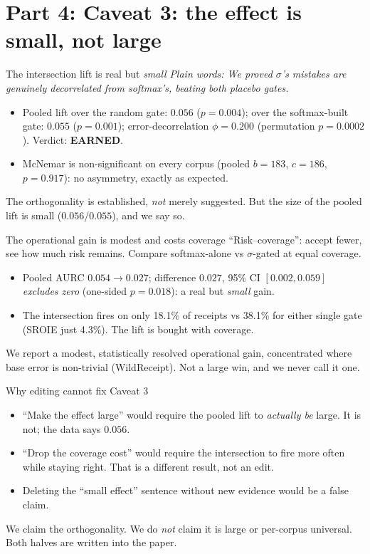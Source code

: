 \documentclass[aspectratio=169]{beamer}
\newcommand{\poolMcB}{183}
\newcommand{\poolMcC}{186}
\newcommand{\poolMcP}{0.917}
\newcommand{\orthEarned}{EARNED}
\newcommand{\orthDrand}{0.056}
\newcommand{\orthDrandP}{0.004}
\newcommand{\orthDcorr}{0.055}
\newcommand{\orthDcorrP}{0.001}
\newcommand{\orthPhi}{0.200}
\newcommand{\orthPhiP}{0.0002}
\newcommand{\rcAURCsoft}{0.054}
\newcommand{\rcAURCsig}{0.027}
\newcommand{\rcAURCd}{0.027}
\newcommand{\rcAURCdLo}{0.002}
\newcommand{\rcAURCdHi}{0.059}
\newcommand{\rcAURCp}{0.018}
\newcommand{\keybox}[1]{\begin{center}\colorbox{grey!15}{\parbox{0.92\linewidth}{\centering #1}}\end{center}}
\newcommand{\plain}[1]{\textit{\textcolor{sig}{Plain words:} #1}}
\begin{document}
\section{Part 4: Caveat 3: the effect is small, not large}
\begin{frame}{The intersection lift is real but \emph{small}}
\plain{We proved $\sigma$'s mistakes are genuinely decorrelated from
softmax's, beating \emph{both} placebo gates.}
\begin{itemize}
\item Pooled lift over the random gate: $\orthDrand$
($p=\orthDrandP$); over the softmax-built gate: $\orthDcorr$
($p=\orthDcorrP$); error-decorrelation $\phi=\orthPhi$ (permutation
$p=\orthPhiP$). Verdict: \textcolor{ok}{\textbf{\orthEarned}}.
\item McNemar is non-significant on every corpus (pooled $b=\poolMcB$,
$c=\poolMcC$, $p=\poolMcP$): no asymmetry, exactly as expected.
\end{itemize}
\keybox{The orthogonality is established, \emph{not} merely suggested.
But the size of the pooled lift is small ($\orthDrand$/$\orthDcorr$),
and we say so.}
\end{frame}

\begin{frame}{The operational gain is modest and costs coverage}
``Risk--coverage'': accept fewer, see how much risk remains. Compare
softmax-alone vs $\sigma$-gated at equal coverage.
\begin{itemize}
\item Pooled AURC $\rcAURCsoft \to \rcAURCsig$; difference
$\rcAURCd$, 95\% CI $[\rcAURCdLo,\rcAURCdHi]$ \emph{excludes zero}
(one-sided $p=\rcAURCp$): a real but \emph{small} gain.
\item The intersection fires on only 18.1\% of receipts vs 38.1\% for
either single gate (SROIE just 4.3\%). The lift is bought with coverage.
\end{itemize}
\keybox{We report a modest, statistically resolved operational gain,
concentrated where base error is non-trivial (WildReceipt). Not a large
win, and we never call it one.}
\end{frame}

\begin{frame}{Why editing cannot fix Caveat 3}
\begin{itemize}
\item ``Make the effect large'' would require the pooled lift to
\emph{actually be} large. It is not; the data says $\orthDrand$.
\item ``Drop the coverage cost'' would require the intersection to fire
more often while staying right. That is a different result, not an edit.
\item Deleting the ``small effect'' sentence without new evidence would
be a false claim.
\end{itemize}
\keybox{We claim the orthogonality. We do \emph{not} claim it is large
or per-corpus universal. Both halves are written into the paper.}
\end{frame}
\end{document}
